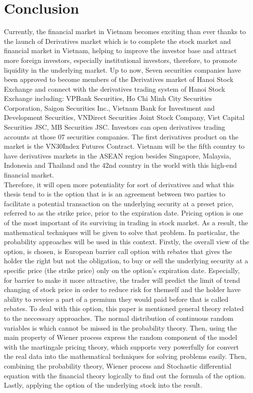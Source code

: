 \chapter{Conclusion}
\fontsize{11pt}{20pt}\selectfont 
Currently, the financial market in Vietnam becomes exciting than ever thanks to the launch of Derivatives market which is to complete the stock market and financial market in Vietnam, helping to improve the investor base and attract more foreign investors, especially institutional investors, therefore, to promote liquidity in the underlying market. Up to now, Seven securities companies have been approved to become members of the Derivatives market of Hanoi Stock Exchange and connect with the derivatives trading system of Hanoi Stock Exchange including: VPBank Securities, Ho Chi Minh City Securities Corporation, Saigon Securities Inc., Vietnam Bank for Investment and Development Securities, VNDirect Securities Joint Stock Company, Viet Capital Securities JSC, MB Securities JSC. Investors can open derivatives trading accounts at those 07 securities companies. The first derivatives product on the market is the VN30Index Futures Contract. Vietnam will be the fifth country to have derivatives markets in the ASEAN region besides Singapore, Malaysia, Indonesia and Thailand and the 42nd country in the world with this high-end financial market. \\[0.5cm]
Therefore, it will open more potentiality for sort of derivatives and what this thesis tend to is the option that is is an agreement between two parties to facilitate a potential transaction on the underlying security at a preset price, referred to as the strike price, prior to the expiration date.  Pricing option is one of the most important of its surviving in trading in stock market. As a result, the mathematical techniques will be given to solve that problem. In particalar, the probability approaches will be used in this context. Firstly, the overall view of the option, is chosen, is European barrier call option with rebates that gives the holder the right but not the obligation, to buy or sell the underlying security at a specific price (the strike price) only on the option's expiration date. Especially, for barrier to make it more attractive, the trader will predict the limit of trend changing of stock price in order to reduce risk for themself and the holder have ability to reveice a part of a premium they would paid before that is called rebates. To deal with this option,  this paper is mentioned general theory related to the neccessary approaches.  The normal distribution of continuous random variables is which cannot be missed in the probability theory. Then, using the main property of Wiener process express the
random component of the model with the martingale pricing theory, which supports very powerfully for convert the real data into the mathematical techniques for solving problems easily. Then, combining the probability theory, Wiener process and Stochastic differential equation with the financial theory logically to find out the formula of the option.  Lastly, applying the option of the underlying stock into the result.  